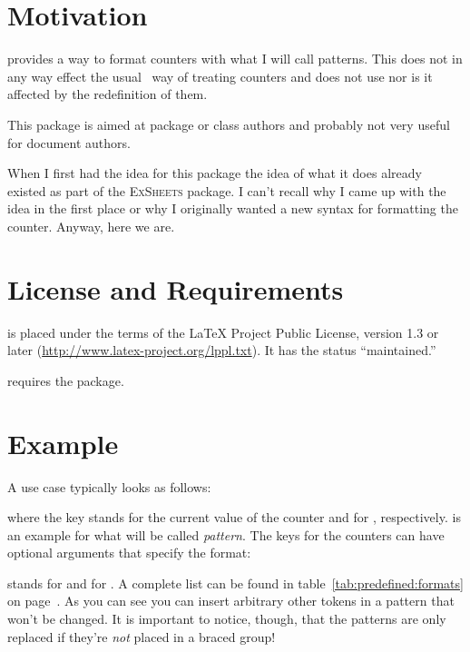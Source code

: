 \documentclass[toc=index,toc=bib,numbers=noendperiod]{cnpkgdoc}
\newcommand*\ExSheets{{\scshape\textcolor{main}{ExSheets}}\xspace}
\begin{document}
\section{Motivation}
\cntformats provides a way to format counters with what I will call patterns.
This does not in any way effect the usual \LaTeXe\ way of treating counters and
does not use  nor is it affected by the redefinition of them.

This package is aimed at package or class authors and probably not very useful
for document authors.

When I first had the idea for this package the idea of what it does already
existed as part of the \ExSheets package. I can't recall why I came up with
the idea in the first place or why I originally wanted a new syntax for
formatting the  counter. Anyway, here we are.

\section{License and Requirements}\label{sec:license}
\cntformats is placed under the terms of the \LaTeX{} Project Public License,
version 1.3 or later (\url{http://www.latex-project.org/lppl.txt}). It has the
status ``maintained.''

\cntformats requires the  package.

\section{Example}
A use case typically looks as follows:
\begin{beispiel}
\end{beispiel}
where the key  stands for the current value of the  counter
and  for , respectively.  is an example
for what will be called \emph{pattern}. The keys for the counters can have optional
arguments that specify the format:
\begin{beispiel}
\end{beispiel}
 stands for  and  for . A complete list can
be found in table~\ref{tab:predefined:formats} on page~\pageref{tab:predefined:formats}.
As you can see you can insert arbitrary other tokens in a pattern that won't be
changed. It is important to notice, though, that the patterns are only replaced
if they're \emph{not} placed in a braced group!
\end{document}
